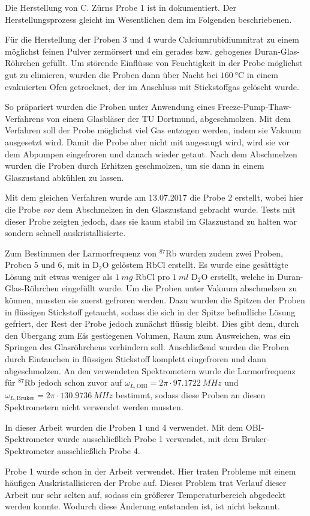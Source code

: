 Die Herstellung von C. Zürns Probe 1 ist in \cite{zuern_arbeit} dokumentiert. Der Herstellungsprozess gleicht im Wesentlichen dem im Folgenden beschriebenen.

Für die Herstellung der Proben 3 und 4 wurde Calciumrubidiumnitrat zu einem möglichst feinen Pulver zermörsert und ein gerades bzw. gebogenes Duran-Glas-Röhrchen gefüllt. Um störende Einflüsse von Feuchtigkeit in der Probe möglichst gut zu elimieren, wurden die Proben dann über Nacht bei $\SI{160}{\degreeCelsius}$ in einem evakuierten Ofen getrocknet, der im Anschluss mit Stickstoffgas gelöscht wurde.

So präpariert wurden die Proben unter Anwendung eines Freeze-Pump-Thaw-Ver\-fah\-rens von einem Glasbläser der TU Dortmund, abgeschmolzen. Mit dem Verfahren soll der Probe möglichst viel Gas entzogen werden, indem sie Vakuum ausgesetzt wird. Damit die Probe aber nicht mit angesaugt wird, wird sie vor dem Abpumpen eingefroren und danach wieder getaut. Nach dem Abschmelzen wurden die Proben durch Erhitzen geschmolzen, um sie dann in einem Glaszustand abkühlen zu lassen.

Mit dem gleichen Verfahren wurde am 13.07.2017 die Probe 2 erstellt, wobei hier die Probe \emph{vor} dem Abschmelzen in den Glaszustand gebracht wurde. Tests mit dieser Probe zeigten jedoch, dass sie kaum stabil im Glaszustand zu halten war sondern schnell auskristallisierte.

Zum Bestimmen der Larmorfrequenz von $^\text{87}$Rb wurden zudem zwei Proben, Proben 5 und 6, mit in D$_\text{2}$O gelöstem RbCl erstellt. Es wurde eine gesättigte Lösung mit etwas weniger als $\SI{1}{mg}$ RbCl pro $\SI{1}{ml}$ D$_\text{2}$O erstellt, welche in Duran-Glas-Röhrchen eingefüllt wurde. Um die Proben unter Vakuum abschmelzen zu können, mussten sie zuerst gefroren werden. Dazu wurden die Spitzen der Proben in flüssigen Stickstoff getaucht, sodass die sich in der Spitze befindliche Lösung gefriert, der Rest der Probe jedoch zunächst flüssig bleibt. Dies gibt dem, durch den Übergang zum Eis gestiegenen Volumen, Raum zum Ausweichen, was ein Springen des Glasröhrchens verhindern soll. Anschließend wurden die Proben durch Eintauchen in flüssigen Stickstoff komplett eingefroren und dann abgeschmolzen. An den verwendeten Spektrometern wurde die Larmorfrequenz für $^\text{87}$Rb jedoch schon zuvor auf $\omega_{L, \text{OBI}} = 2\pi \cdot \SI{97.1722}{MHz}$ und $\omega_{L, \text{Bruker}} = 2\pi \cdot \SI{130.9736}{MHz}$ bestimmt, sodass diese Proben an diesen Spektrometern nicht verwendet werden mussten.

In dieser Arbeit wurden die Proben 1 und 4 verwendet. Mit dem OBI-Spektrometer wurde ausschließlich Probe 1 verwendet, mit dem Bruker-Spektrometer ausschließlich Probe 4.

Probe 1 wurde schon in der Arbeit \cite{joachim_master} verwendet. Hier traten Probleme mit einem häufigen Auskristallisieren der Probe auf. Dieses Problem trat Verlauf dieser Arbeit nur sehr selten auf, sodass ein größerer Temperaturbereich abgedeckt werden konnte. Wodurch diese Änderung entstanden ist, ist nicht bekannt.
